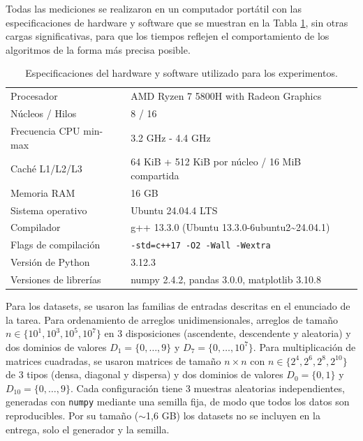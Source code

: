 Todas las mediciones se realizaron en un computador portátil con las especificaciones de hardware y software que se muestran en la Tabla \ref{figure:hardware}, sin otras cargas significativas, para que los tiempos reflejen el comportamiento de los algoritmos de la forma más precisa posible.

\begin{table}[H]
    \centering
    \begin{tabular}{l|l}
        Procesador & AMD Ryzen 7 5800H with Radeon Graphics \\
        Núcleos / Hilos  & 8 / 16 \\
        Frecuencia CPU min-max & 3.2 GHz - 4.4 GHz \\
        Caché L1/L2/L3 & 64 KiB + 512 KiB por núcleo / 16 MiB compartida \\
        Memoria RAM & 16 GB \\
        Sistema operativo & Ubuntu 24.04.4 LTS \\
        Compilador & g++ 13.3.0 (Ubuntu 13.3.0-6ubuntu2\textasciitilde{}24.04.1) \\
        Flags de compilación & \texttt{-std=c++17 -O2 -Wall -Wextra} \\
        Versión de Python & 3.12.3 \\
        Versiones de librerías & numpy 2.4.2, pandas 3.0.0, matplotlib 3.10.8
    \end{tabular}
    \caption{Especificaciones del hardware y software utilizado para los experimentos.}
    \label{figure:hardware}

\end{table}

Para los datasets, se usaron las familias de entradas descritas en el enunciado de la tarea. Para ordenamiento de arreglos unidimensionales, arreglos de tamaño $n \in \{ 10^1, 10^3, 10^5, 10^7 \}$ en 3 disposiciones (ascendente, descendente y aleatoria) y dos dominios de valores $D_1 = \{ 0, \dots , 9 \}$ y $D_7 = \{ 0, \dots , 10^7 \}$. Para multiplicación de matrices cuadradas, se usaron matrices de tamaño $n \times n $ con $n \in \{ 2^4, 2^6, 2^8, 2^{10} \}$ de 3 tipos (densa, diagonal y dispersa) y dos dominios de valores $D_0 = \{ 0, 1 \}$ y $D_{10} = \{ 0, \dots , 9 \}$.
Cada configuración tiene 3 muestras aleatorias independientes, generadas con \texttt{numpy} mediante una semilla fija, de modo que todos los datos son reproducibles. Por su tamaño ($\sim$1{,}6 GB) los datasets no se incluyen en la entrega, solo el generador y la semilla.

